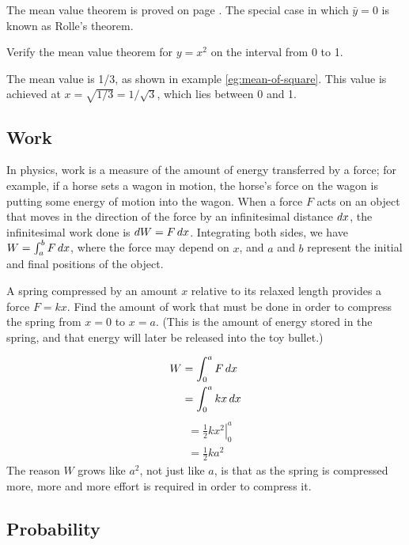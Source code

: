 The mean value theorem is proved on page \pageref{detour:mean-value-proof}.
The special case in which $\bar{y}=0$ is known as Rolle's theorem.

\begin{eg}
\egquestion Verify the mean value theorem for $y=x^2$ on the interval from 0 to 1.

\eganswer The mean value is 1/3, as shown in example \ref{eg:mean-of-square}. This value
is achieved at $x=\sqrt{1/3}=1/\sqrt{3}$, which lies between 0 and 1.
\end{eg}

\subsection{Work}
In physics, work is a measure of the amount of energy transferred by a force; for example, if a horse
sets a wagon in motion, the horse's force on the wagon is putting some energy of motion into the wagon.
When a force $F$ acts on an object that moves in the direction of the force by an infinitesimal
distance $\mathop{d\!} x$, the infinitesimal work done is $\mathop{d\!} W=F\mathop{d\!} x$. Integrating both sides,
we have $W=\int_a^b F\mathop{d\!} x$, where the force may depend on $x$, and $a$ and $b$ represent the
initial and final positions of the object. 

\begin{eg}
\egquestion A spring compressed by an amount $x$ relative to its relaxed length provides
a force $F=kx$. Find the amount of work that must be done in order to compress the spring
from $x=0$ to $x=a$. (This is the amount of energy stored in the spring, and that energy
will later be released into the toy bullet.)

\eganswer
\begin{align*}
  W &= \int_0^a F \mathop{d\!} x \\
    &= \int_0^a kx \mathop{d\!} x
\end{align*}
\begin{align*}
    &= \left.\frac{1}{2}kx^2\right|_0^a \\
    &= \frac{1}{2}ka^2
\end{align*}
The reason $W$ grows like $a^2$, not just like $a$, is that as the spring is compressed
more, more and more effort is required in order to compress it.
\end{eg}

\subsection{Probability}

